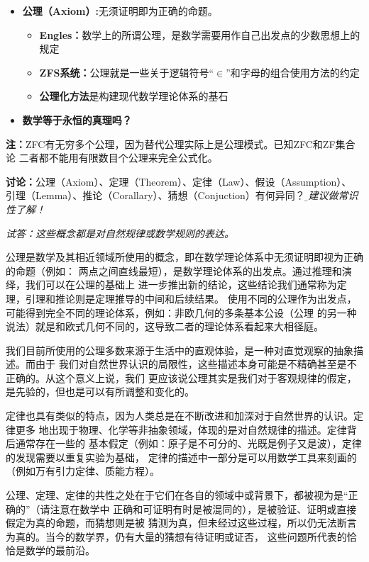 \begin{shaded}
\begin{itemize}
	\item {\bf 公理（Axiom）:}无须证明即为正确的命题。
	\begin{itemize}
	  \item {\bf Engles：}数学上的所谓公理，是数学需要用作自己出发点的少数思想上的规定 
	  \item {\bf ZFS系统：}公理就是一些关于逻辑符号{“$\in$”}和{字母}的组合使用方法的约定
	  \item {\bf 公理化方法}是构建现代数学理论体系的基石
	\end{itemize}
	\item {\bf {数学等于永恒的真理吗？}}
	\end{itemize}
	
	{\bf 注：}ZFC有无穷多个公理，因为替代公理实际上是公理模式。已知ZFC和ZF集合论
	二者都不能用有限数目个公理来完全公式化。
	
	{\bf 讨论：}公理（Axiom）、定理（Theorem）、定律（Law）、假设（Assumption）、
	引理（Lemma）、推论（Corallary）、猜想（Conjuction）有何异同？
	{\b\dotfill\it 建议做常识性了解！}
	
	{\it 试答：这些概念都是对自然规律或数学规则的表达。
	
	公理是数学及其相近领域所使用的概念，即在数学理论体系中无须证明即视为正确的命题（例如：
	两点之间直线最短），是数学理论体系的出发点。通过推理和演绎，我们可以在公理的基础上
	进一步推出新的结论，这些结论我们通常称为定理，引理和推论则是定理推导的中间和后续结果。
	使用不同的公理作为出发点，可能得到完全不同的理论体系，例如：非欧几何的多条基本公设（公理
	的另一种说法）就是和欧式几何不同的，这导致二者的理论体系看起来大相径庭。
	
	我们目前所使用的公理多数来源于生活中的直观体验，是一种对直觉观察的抽象描述。而由于
	我们对自然世界认识的局限性，这些描述本身可能是不精确甚至是不正确的。从这个意义上说，我们
	更应该说公理其实是我们对于客观规律的假定，是先验的，但也是可以有所调整和变化的。
	
	定律也具有类似的特点，因为人类总是在不断改进和加深对于自然世界的认识。定律更多
	地出现于物理、化学等非抽象领域，体现的是对自然规律的描述。定律背后通常存在一些的
	基本假定（例如：原子是不可分的、光既是例子又是波），定律的发现需要以重复实验为基础，
	定律的描述中一部分是可以用数学工具来刻画的（例如万有引力定律、质能方程）。
	
	公理、定理、定律的共性之处在于它们在各自的领域中或背景下，都被视为是“正确的”（请注意在数学中
	正确和可证明有时是被混同的），是被验证、证明或直接假定为真的命题，而猜想则是被
	猜测为真，但未经过这些过程，所以仍无法断言为真的。当今的数学界，仍有大量的猜想有待证明或证否，
	这些问题所代表的恰恰是数学的最前沿。
	}
\end{shaded}
	

